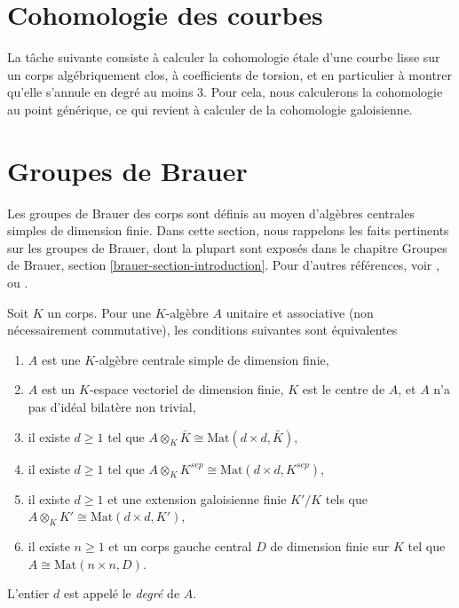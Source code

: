 \section{Cohomologie des courbes}
\label{section-cohomology-curves}

\noindent
La t\^ache suivante consiste \`a calculer la cohomologie \'etale d'une courbe lisse
sur un corps alg\'ebriquement clos, \`a coefficients de torsion, et en
particulier \`a montrer qu'elle s'annule en degr\'e au moins $3$. Pour cela, nous
calculerons la cohomologie au point g\'en\'erique, ce qui
revient \`a calculer de la cohomologie galoisienne.





\section{Groupes de Brauer}
\label{section-brauer-groups}

\noindent
Les groupes de Brauer des corps sont d\'efinis au moyen d'alg\`ebres centrales simples de dimension finie.
Dans cette section, nous rappelons les faits pertinents sur les groupes de Brauer, dont la plupart
sont expos\'es dans le chapitre
Groupes de Brauer, section \ref{brauer-section-introduction}.
Pour d'autres r\'ef\'erences, voir \cite{SerreCorpsLocaux},
\cite{SerreGaloisCohomology} ou \cite{Weil}.

\begin{theorem}
\label{theorem-central-simple-algebra}
Soit $K$ un corps. Pour une $K$-alg\`ebre $A$ unitaire et associative (non n\'ecessairement commutative),
les conditions suivantes sont \'equivalentes
\begin{enumerate}
\item $A$ est une $K$-alg\`ebre centrale simple de dimension finie,
\item $A$ est un $K$-espace vectoriel de dimension finie, $K$ est le centre de $A$,
et $A$ n'a pas d'id\'eal bilat\`ere non trivial,
\item il existe $d \geq 1$ tel que
$A \otimes_K \bar K \cong \text{Mat}(d \times d, \bar K)$,
\item il existe $d \geq 1$ tel que
$A \otimes_K K^{sep} \cong \text{Mat}(d \times d, K^{sep})$,
\item il existe $d \geq 1$ et une extension galoisienne finie $K'/K$
tels que
$A \otimes_K K' \cong \text{Mat}(d \times d, K')$,
\item il existe $n \geq 1$ et un corps gauche central $D$ de dimension finie
sur $K$ tel que $A \cong \text{Mat}(n \times n, D)$.
\end{enumerate}
L'entier $d$ est appel\'e le {\it degr\'e} de $A$.
\end{theorem}

